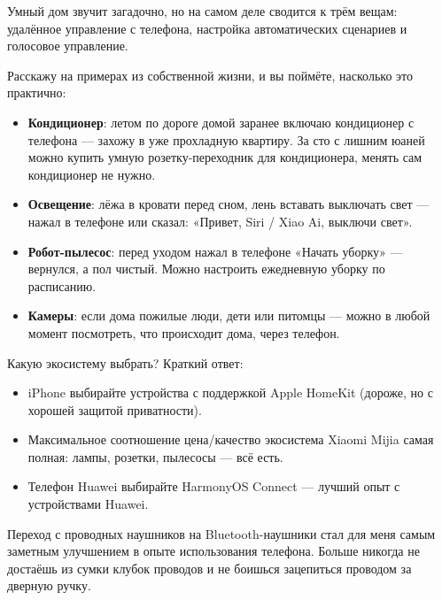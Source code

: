 
Умный дом звучит загадочно, но на самом деле сводится к трём вещам: удалённое управление с телефона, настройка автоматических сценариев и голосовое управление.

Расскажу на примерах из собственной жизни, и вы поймёте, насколько это практично:

\begin{itemize}
  \item \textbf{Кондиционер}: летом по дороге домой заранее включаю кондиционер с телефона — захожу в уже прохладную квартиру. За сто с лишним юаней можно купить умную розетку-переходник для кондиционера, менять сам кондиционер не нужно.
  \item \textbf{Освещение}: лёжа в кровати перед сном, лень вставать выключать свет — нажал в телефоне или сказал: «Привет, Siri / Xiao Ai, выключи свет».
  \item \textbf{Робот-пылесос}: перед уходом нажал в телефоне «Начать уборку» — вернулся, а пол чистый. Можно настроить ежедневную уборку по расписанию.
  \item \textbf{Камеры}: если дома пожилые люди, дети или питомцы — можно в любой момент посмотреть, что происходит дома, через телефон.
\end{itemize}

Какую экосистему выбрать? Краткий ответ:

\begin{itemize}
  \item iPhone выбирайте устройства с поддержкой Apple HomeKit (дороже, но с хорошей защитой приватности).
  \item Максимальное соотношение цена/качество экосистема Xiaomi Mijia самая полная: лампы, розетки, пылесосы — всё есть.
  \item Телефон Huawei выбирайте HarmonyOS Connect — лучший опыт с устройствами Huawei.
\end{itemize}


Переход с проводных наушников на Bluetooth-наушники стал для меня самым заметным улучшением в опыте использования телефона. Больше никогда не достаёшь из сумки клубок проводов и не боишься зацепиться проводом за дверную ручку.

